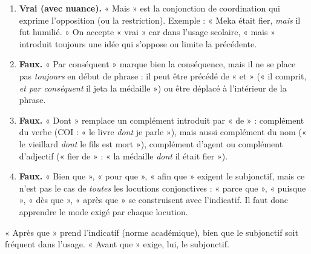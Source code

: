 \documentclass[11pt]{article}
\newcommand{\cle}[1]{{\popxbold\color{popdark}#1}}
\begin{document}
\begin{corrige}
\begin{enumerate}
\item \textbf{Vrai (avec nuance).} « Mais » est la conjonction de coordination qui exprime l'\cle{opposition} (ou la restriction). Exemple : « Meka était fier, \emph{mais} il fut humilié. » On accepte « vrai » car dans l'usage scolaire, « mais » introduit toujours une idée qui s'oppose ou limite la précédente.
\item \textbf{Faux.} « Par conséquent » marque bien la \cle{conséquence}, mais il ne se place pas \emph{toujours} en début de phrase : il peut être précédé de « et » (« il comprit, \emph{et par conséquent} il jeta la médaille ») ou être déplacé à l'intérieur de la phrase.
\item \textbf{Faux.} « Dont » remplace un complément introduit par « de » : complément du verbe (COI : « le livre \emph{dont} je parle »), mais aussi complément du nom (« le vieillard \emph{dont} le fils est mort »), complément d'agent ou complément d'adjectif (« fier de » : « la médaille \emph{dont} il était fier »).
\item \textbf{Faux.} « Bien que », « pour que », « afin que » exigent le subjonctif, mais ce n'est pas le cas de \emph{toutes} les locutions conjonctives : « parce que », « puisque », « dès que », « après que » se construisent avec l'indicatif. Il faut donc apprendre le mode exigé par chaque locution.
\end{enumerate}
\end{corrige}

\begin{attention}
« Après que » prend l'indicatif (norme académique), bien que le subjonctif soit fréquent dans l'usage. « Avant que » exige, lui, le subjonctif.
\end{attention}
\end{document}
